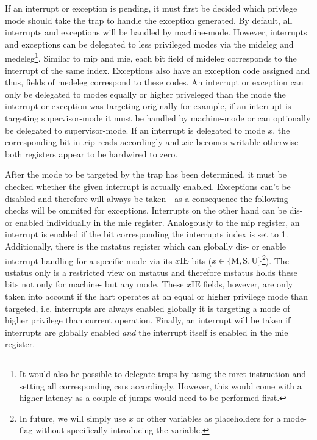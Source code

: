 If an interrupt or exception is pending, it must first be decided which privlege mode should take the trap to handle the exception generated.
By default, all interrupts and exceptions will be handled by machine-mode.
However, interrupts and exceptions can be delegated to less privileged modes via the \gls{mideleg} and \gls{medeleg}\footnote{%
    It would also be possible to delegate traps by using the \gls{mret} instruction and setting all corresponding \glspl{csr} accordingly.
    However, this would come with a higher latency as a couple of jumps would need to be performed first.
}.
Similar to \gls{mip} and \gls{mie}, each bit field of \gls{mideleg} corresponds to the interrupt of the same index.
Exceptions also have an exception code assigned and thus, fields of \gls{medeleg} correspond to these codes.
An interrupt or exception can only be delegated to modes equally or higher priveleged than the mode the interrupt or exception was targeting originally for example, if an interrupt is targeting supervisor-mode it must be handled by machine-mode or can optionally be delegated to supervisor-mode.
If an interrupt is delegated to mode $ x $, the corresponding bit in $ x\text{ip} $ reads accordingly and $ x\text{ie} $ becomes writable otherwise both registers appear to be hardwired to zero.

After the mode to be targeted by the trap has been determined, it must be checked whether the given interrupt is actually enabled.
Exceptions can't be disabled and therefore will always be taken - as a consequence the following checks will be ommited for exceptions.
Interrupts on the other hand can be dis- or enabled individually in the \gls{mie} register.
Analogously to the \gls{mip} register, an interrupt is enabled if the bit corresponding the interrupts index is set to 1.
Additionally, there is the \gls{mstatus} register which can globally dis- or enable interrupt handling for a specific mode via its $ x\text{IE} $ bits ($ x \in \{ \text{M}, \text{S}, \text{U}\} $\footnote{%
    In future, we will simply use $ x $ or other variables as placeholders for a mode-flag without specifically introducing the variable.
}).
The \gls{ustatus} only is a restricted view on \gls{mstatus} and therefore \gls{mstatus} holds these bits not only for machine- but any mode.
These $ x\text{IE} $ fields, however, are only taken into account if the \gls{hart} operates at an equal or higher privilege mode than targeted, i.e. interrupts are always enabled globally it is targeting a mode of higher privilege than current operation.
Finally, an interrupt will be taken if interrupts are globally enabled \textit{and} the interrupt itself is enabled in the \gls{mie} register.

